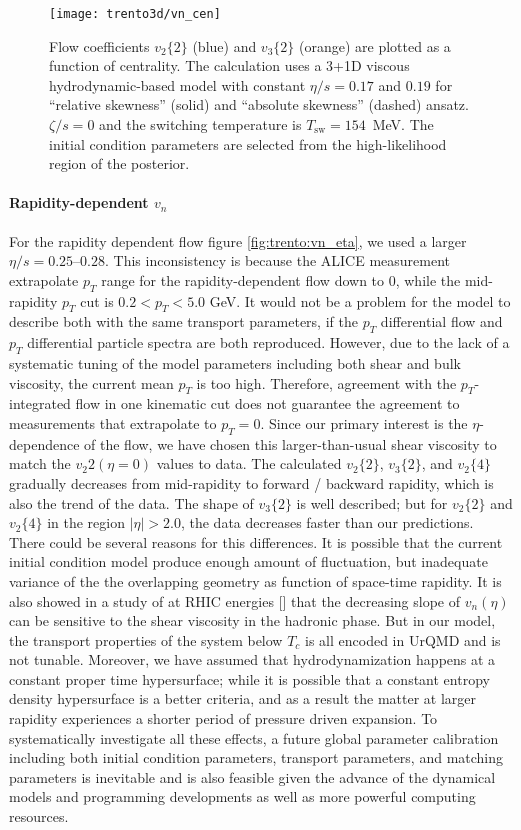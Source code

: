 \begin{figure}
\centering
\texttt{[image: trento3d/vn\_cen]}
\caption{Flow coefficients $v_2\{2\}$ (blue) and $v_3\{2\}$ (orange) are plotted as a function of centrality. The calculation uses a 3+1D viscous hydrodynamic-based model with constant $\eta/s=0.17$ and $0.19$ for ``relative skewness'' (solid) and ``absolute skewness'' (dashed) ansatz. $\zeta/s=0$ and the switching temperature is $T_\text{sw}=154$~MeV.
The initial condition parameters are selected from the high-likelihood region of the posterior.}
\label{fig:trento:vn_cen}
\end{figure}

\paragraph{Rapidity-dependent $v_n$} For the rapidity dependent flow figure \ref{fig:trento:vn_eta}, we used a larger $\eta/s=0.25$--$0.28$. 
This inconsistency is because the ALICE measurement extrapolate $p_T$ range for the rapidity-dependent flow down to 0, while the mid-rapidity  $p_T$ cut is $0.2 < p_T < 5.0$ GeV.
It would not be a problem for the model to describe both with the same transport parameters, if the $p_T$ differential flow and $p_T$ differential particle spectra are both reproduced.
However, due to the lack of a systematic tuning of the model parameters including both shear and bulk viscosity, the current mean $p_T$ is too high.
Therefore, agreement with the $p_T$-integrated flow in one kinematic cut does not guarantee the agreement to measurements that extrapolate to $p_T = 0$.
Since our primary interest is the $\eta$-dependence of the flow, we have chosen this larger-than-usual shear viscosity to match the $v_2{2}(\eta=0)$ values to data.
The calculated $v_2\{2\}$, $v_3\{2\}$, and $v_2\{4\}$ gradually decreases from mid-rapidity to forward / backward rapidity, which is also the trend of the data.
The shape of $v_3\{2\}$ is well described; but for $v_2\{2\}$ and $v_2\{4\}$ in the region $|\eta| > 2.0$, the data decreases faster than our predictions.
There could be several reasons for this differences.
It is possible that the current initial condition model produce enough amount of fluctuation, but inadequate variance of the the overlapping geometry as function of space-time rapidity.
It is also showed in a study of at RHIC energies [] that the decreasing slope of $v_n(\eta)$ can be sensitive to the shear viscosity in the hadronic phase. 
But in our model, the transport properties of the system below $T_c$ is all encoded in UrQMD and is not tunable. 
Moreover, we have assumed that hydrodynamization happens at a constant proper time hypersurface;
while it is possible that a constant entropy density hypersurface is a better criteria, and as a result the matter at larger rapidity experiences a shorter period of pressure driven expansion.
To systematically investigate all these effects, a future global parameter calibration including both initial condition parameters, transport parameters, and matching parameters is inevitable and is also feasible given the advance of the dynamical models and programming developments as well as more powerful computing resources.


